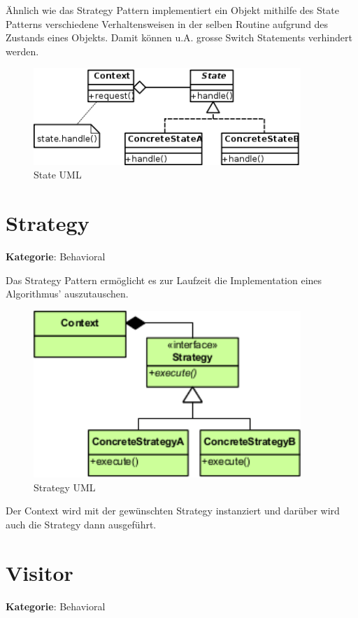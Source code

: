 Ähnlich wie das Strategy Pattern implementiert ein Objekt mithilfe des State Patterns verschiedene Verhaltensweisen in der selben Routine aufgrund des Zustands eines Objekts. Damit können u.A. grosse Switch Statements verhindert werden.

\begin{figure}[H]
	\centering
	\includegraphics[width=0.9\textwidth]{content/gof/images/15-state-uml.png}
	\caption{State UML}
\end{figure}


\section{Strategy}
\textbf{Kategorie}: Behavioral

Das Strategy Pattern ermöglicht es zur Laufzeit die Implementation eines Algorithmus' auszutauschen.

\begin{figure}[H]
	\centering
	\includegraphics[width=0.9\textwidth]{content/gof/images/16-strategy-uml.png}
	\caption{Strategy UML}
\end{figure}


Der Context wird mit der gewünschten Strategy instanziert und darüber wird auch die Strategy dann ausgeführt.

\section{Visitor}
\textbf{Kategorie}: Behavioral

